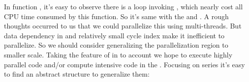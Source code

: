 \documentclass{article}
\begin{document}
\noindent{}In function , it's easy to observe there is a loop invoking , which nearly cost all CPU time consumed by this function. So it's same with the  and . A rough thoughts occurred to us that we could parallelize this  using multi-threads. But data dependency in  and relatively small cycle index make it inefficient to parallelize. So   we should consider generalizing the parallelization region to smaller scale. Taking the feature of  in to account we hope to execute highly parallel code and/or compute intensive code in the . Focusing on  series it's easy to find an abstract structure to generalize them:%
\end{document}
